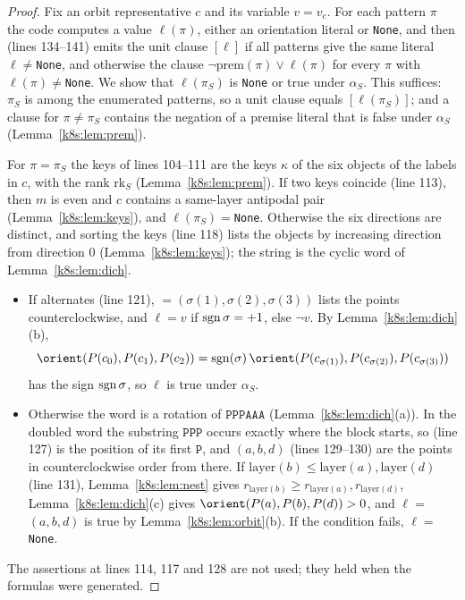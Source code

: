 \begin{proof}
Fix an orbit representative $c$ and its variable $v=v_c$. For each pattern $\pi$ the code computes a value
$\ell(\pi)$, either an orientation literal or \texttt{None}, and then (lines 134--141) emits the unit clause
$[\ell]$ if all patterns give the same literal $\ell\ne$\texttt{None}, and otherwise the clause
$\neg\mathrm{prem}(\pi)\vee\ell(\pi)$ for every $\pi$ with $\ell(\pi)\ne$\texttt{None}. We show that $\ell(\pi_S)$ is
\texttt{None} or true under $\alpha_S$. This suffices: $\pi_S$ is among the enumerated patterns, so a unit clause equals
$[\ell(\pi_S)]$; and a clause for $\pi\ne\pi_S$ contains the negation of a premise literal that is false under
$\alpha_S$ (Lemma~\ref{k8s:lem:prem}).

For $\pi=\pi_S$ the keys of lines 104--111 are the keys $\kappa$ of the six objects of the labels in $c$, with the rank
$\mathrm{rk}_S$ (Lemma~\ref{k8s:lem:prem}). If two keys coincide (line 113), then $m$ is even and $c$ contains a
same-layer antipodal pair (Lemma~\ref{k8s:lem:keys}), and $\ell(\pi_S)=$\texttt{None}. Otherwise the six directions are
distinct, and sorting the keys (line 118) lists the objects by increasing direction from direction $0$
(Lemma~\ref{k8s:lem:keys}); the string  is the cyclic word of Lemma~\ref{k8s:lem:dich}.
\begin{itemize}
\item If  alternates (line 121),  $=(\sigma(1),\sigma(2),\sigma(3))$ lists the points counterclockwise,
and $\ell=v$ if $\operatorname{sgn}\sigma=+1$, else $\neg v$. By Lemma~\ref{k8s:lem:dich}(b),
\[
\orient(P(c_0),P(c_1),P(c_2))=\sgn(\sigma)\,\orient(P(c_{\sigma(1)}),P(c_{\sigma(2)}),P(c_{\sigma(3)}))
\]
has the sign $\operatorname{sgn}\sigma$, so $\ell$ is true under $\alpha_S$.
\item Otherwise the word is a rotation of $\mathtt{PPPAAA}$ (Lemma~\ref{k8s:lem:dich}(a)). In the doubled word the
substring $\mathtt{PPP}$ occurs exactly where the block starts, so  (line 127) is the position of
its first $\mathtt P$, and $(a,b,d)$ (lines 129--130) are the points in counterclockwise order from there. If
$\mathrm{layer}(b)\le\mathrm{layer}(a),\mathrm{layer}(d)$ (line 131), Lemma~\ref{k8s:lem:nest} gives
$r_{\mathrm{layer}(b)}\ge r_{\mathrm{layer}(a)},r_{\mathrm{layer}(d)}$, Lemma~\ref{k8s:lem:dich}(c) gives
$\orient(P(a),P(b),P(d))>0$, and $\ell=$$(a,b,d)$ is true by Lemma~\ref{k8s:lem:orbit}(b). If the condition
fails, $\ell=$\texttt{None}.
\end{itemize}
The assertions at lines 114, 117 and 128 are not used; they held when the formulas were generated.
\end{proof}

